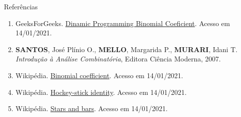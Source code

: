 \begin{frame}[fragile]{Referências}

    \begin{enumerate}
       \item GeeksForGeeks. \href{http://www.geeksforgeeks.org/dynamic-programming-set-9-binomial-coefficient/}{Dinamic Programming Binomial Coeficient}. Acesso em 14/01/2021.

        \item \textbf{SANTOS}, José Plínio O., \textbf{MELLO}, Margarida P., \textbf{MURARI}, 
            Idani T. \textit{Introdução à Análise Combinatória}, Editora Ciência Moderna, 2007.

        \item Wikipédia. \href{https://en.wikipedia.org/wiki/Binomial_coefficient}{Binomial coefficient}. Acesso em 14/01/2021.

        \item Wikipédia. \href{https://en.wikipedia.org/wiki/Hockey-stick_identity}{Hockey-stick identity}. Acesso em 14/01/2021.

        \item Wikipédia. \href{https://en.wikipedia.org/wiki/Stars_and_bars_(combinatorics)}{Stars and bars}. Acesso em 14/01/2021.
    \end{enumerate}

\end{frame}
